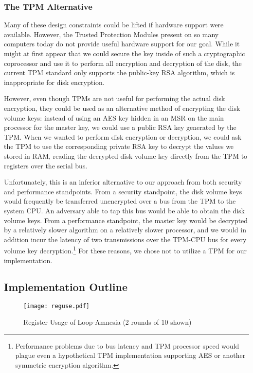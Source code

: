 \documentclass[letterpaper,twocolumn,nonatbib,10pt]{article}
\begin{document}
\subsubsection*{The TPM Alternative}

Many of these design constraints could be lifted if hardware support
were available.  However, the Trusted Protection
Modules\cite{tpmfoolery} present on so many computers today do not
provide useful hardware support for our goal.  While it might at first
appear that we could secure the key inside of such a cryptographic
coprocessor and use it to perform all encryption and decryption of the
disk, the current TPM standard only supports the public-key RSA
algorithm, which is inappropriate for disk encryption.

However, even though TPMs are not useful for performing the actual
disk encryption, they could be used as an alternative method of
encrypting the disk volume keys: instead of using an AES key hidden in
an MSR on the main processor for the master key, we could use a public
RSA key generated by the TPM.  When we wanted to perform disk
encryption or decryption, we could ask the TPM to use the
corresponding private RSA key to decrypt the values we stored in RAM,
reading the decrypted disk volume key directly from the TPM to
registers over the serial bus.

Unfortunately, this is an inferior alternative to our approach from
both security and performance standpoints.  From a security
standpoint, the disk volume keys would frequently be transferred
unencrypted over a bus from the TPM to the system CPU.  An adversary
able to tap this bus would be able to obtain the disk volume keys.
From a performance standpoint, the master key would be decrypted by a
relatively slower algorithm on a relatively slower processor, and we
would in addition incur the latency of two transmissions over the
TPM-CPU bus for every volume key decryption.\footnote{Performance
  problems due to bus latency and TPM processor speed would plague
  even a hypothetical TPM implementation supporting AES or another
  symmetric encryption algorithm.}  For these reasons, we
chose not to utilize a TPM for our implementation.

\subsection{Implementation Outline}
\label{outline}

\begin{figure*}[t]
\texttt{[image: reguse.pdf]}
\caption{Register Usage of Loop-Amnesia (2 rounds of 10 shown)}
\label{fig:reguse}
\end{figure*}
\end{document}
